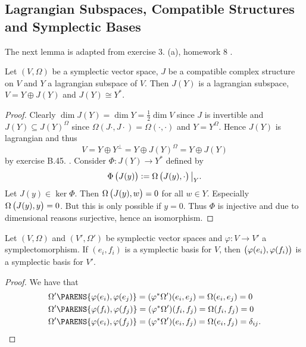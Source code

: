 \appendix
\begin{appendix}
	\section{Lagrangian Subspaces, Compatible Structures and Symplectic Bases}
	The next lemma is adapted from exercise 3. (a), homework 8 \cite[88]{dasilva:symplectic:2008}.
	\begin{lemma}
		Let $(V,\Omega)$ be a symplectic vector space, $J$ be a compatible complex structure on $V$ and $Y$ a lagrangian subspace of $V$. Then $J(Y)$ is a lagrangian subspace, $V = Y \oplus J(Y)$ and $J(Y) \cong Y^*$.
		\label{lem:decomposition}
	\end{lemma}

	\begin{proof}
		Clearly $\dim J(Y) = \dim Y = \frac{1}{2}\dim V$ since $J$ is invertible and $J(Y) \subseteq J(Y)^\Omega$ since $\Omega(J\cdot,J\cdot) = \Omega(\cdot,\cdot)$ and $Y = Y^\Omega$. Hence $J(Y)$ is lagrangian and thus 
\begin{equation*}
V = Y \oplus Y^\perp = Y \oplus J(Y)^\Omega = Y \oplus J(Y)
\end{equation*}
\noindent by exercise B.45. \cite[637]{lee:smooth_manifolds:2013}. Consider $\Phi : J(Y) \to Y^*$ defined by 
\begin{equation*}
\Phi\del[1]{J(y)} := \Omega\del[1]{J(y),\cdot}\big\vert_Y. 
\end{equation*}
Let $J(y) \in \ker \Phi$. Then $\Omega\del[1]{J(y),w} = 0$ for all $w \in Y$. Especially $\Omega\del[1]{J(y),y} = 0$. But this is only possible if $y = 0$. Thus $\Phi$ is injective and due to dimensional reasons surjective, hence an isomorphism. 
	\end{proof}

	\begin{lemma}
		Let $(V,\Omega)$ and $(V',\Omega')$ be symplectic vector spaces and $\varphi : V \to V'$ a symplectomorphism. If $(e_i,f_i)$ is a symplectic basis for $V$, then $\del[1]{\varphi(e_i),\varphi(f_i)}$ is a symplectic basis for $V'$.
		\label{lem:symplectic_basis}
	\end{lemma}

	\begin{proof}
		We have that
\begin{align*}
	&\Omega'\PARENS{\varphi(e_i),\varphi(e_j)} = (\varphi^*\Omega')(e_i,e_j) = \Omega(e_i,e_j) = 0\\
&\Omega'\PARENS{\varphi(f_i),\varphi(f_j)} = (\varphi^*\Omega')(f_i,f_j) = \Omega(f_i,f_j) = 0\\
&\Omega'\PARENS{\varphi(e_i),\varphi(f_j)} = (\varphi^*\Omega')(e_i,f_j) = \Omega(e_i,f_j) = \delta_{ij}.
\end{align*}
	\end{proof}
\end{appendix}

\printbibliography

